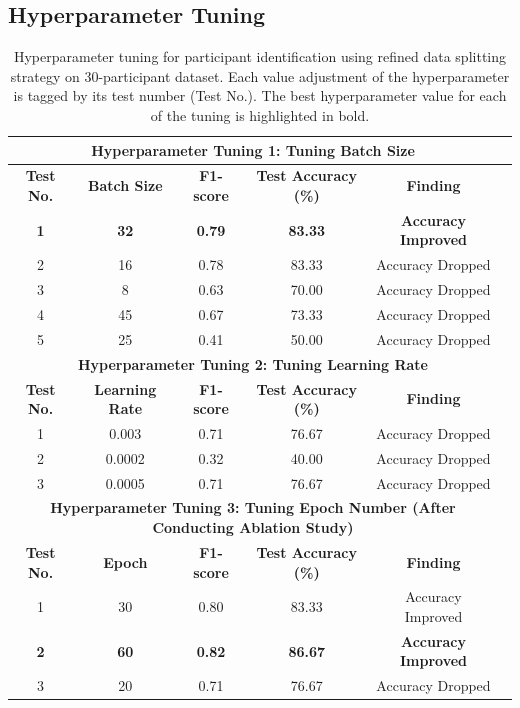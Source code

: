 \documentclass{l4proj}
\begin{document}
\begin{appendices}
\subsection{Hyperparameter Tuning}
\begin{table}[h]
    \centering
    \begin{tabular}{cccccc}
        \multicolumn{5}{c}{\textbf{Hyperparameter Tuning 1: Tuning Batch Size}} \\
        \toprule
        \textbf{Test No.} & \textbf{Batch Size} & \textbf{F1-score} & \textbf{Test Accuracy (\%)} & \textbf{Finding} \\
        \textbf{1} & \textbf{32} & \textbf{0.79} & \textbf{83.33} & \textbf{Accuracy Improved} \\
        2 & 16 & 0.78 & 83.33 & Accuracy Dropped \\
        3 & 8 & 0.63 & 70.00 & Accuracy Dropped \\
        4 & 45 & 0.67 & 73.33 & Accuracy Dropped \\
        5 & 25 & 0.41 & 50.00 & Accuracy Dropped \\
        \midrule
        \multicolumn{5}{c}{\textbf{Hyperparameter Tuning 2: Tuning Learning Rate}} \\
        \midrule
        \textbf{Test No.} & \textbf{Learning Rate} & \textbf{F1-score} & \textbf{Test Accuracy (\%)} & \textbf{Finding} \\
        1 & 0.003 & 0.71 & 76.67 & Accuracy Dropped \\
        2 & 0.0002 & 0.32 & 40.00 & Accuracy Dropped \\
        3 & 0.0005 & 0.71 & 76.67 & Accuracy Dropped \\
        \midrule
        \multicolumn{5}{c}{\textbf{Hyperparameter Tuning 3: Tuning Epoch Number (After Conducting Ablation Study)}} \\
        \midrule
        \textbf{Test No.} & \textbf{Epoch} & \textbf{F1-score} & \textbf{Test Accuracy (\%)} & \textbf{Finding} \\
        1 & 30 & 0.80 & 83.33 & Accuracy Improved \\
        \textbf{2} & \textbf{60} & \textbf{0.82} & \textbf{86.67} & \textbf{Accuracy Improved} \\
        3 & 20 & 0.71 & 76.67 & Accuracy Dropped \\
        \bottomrule
    \end{tabular}
    \caption{Hyperparameter tuning for participant identification using refined data splitting strategy on 30-participant dataset. Each value adjustment of the hyperparameter is tagged by its test number (Test No.). The best hyperparameter value for each of the tuning is highlighted in bold.}
    \label{tab:participant-hyperparameter-tuning}
\end{table}


\end{appendices}
\end{document}
